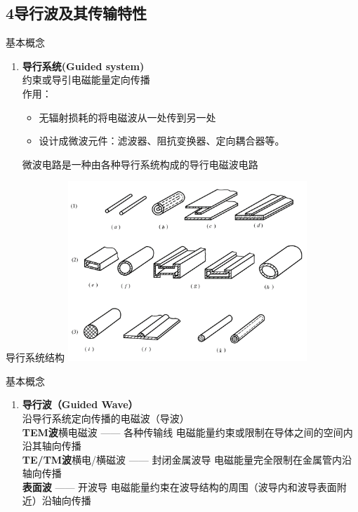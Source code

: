 \documentclass{ctexbeamer}
\newcounter{savedenum}
\newcommand*{\saveenum}{\setcounter{savedenum}{\theenumi}}
\newcommand*{\resume}{\setcounter{enumi}{\thesavedenum}}
\begin{document}
\subsection{4\quad 导行波及其传输特性}
\begin{frame}{基本概念}
  \begin{enumerate}
    \item \textbf{导行系统(Guided system)}
    \saveenum
    \\约束或导引电磁能量定向传播\\
    作用：\\
    \begin{itemize}
      \item 无辐射损耗的将电磁波从一处传到另一处
      \item 设计成微波元件：滤波器、阻抗变换器、定向耦合器等。
    \end{itemize}
    微波电路是一种由各种导行系统构成的导行电磁波电路
  \end{enumerate}

\end{frame}

\begin{frame}{导行系统结构}
    \centering
    \includegraphics[width=9cm]{guidesystem.png}
\end{frame}

\begin{frame}{基本概念}
  \begin{enumerate}
    \resume
    \item \textbf{导行波（Guided Wave）}
    \\沿导行系统定向传播的电磁波（导波）
    \\\textbf{TEM波}\quad 横电磁波 —— 各种传输线 电磁能量约束或限制在导体之间的空间内沿其轴向传播
    \\\textbf{TE/TM波}\quad 横电/横磁波 —— 封闭金属波导 电磁能量完全限制在金属管内沿轴向传播
    \\\textbf{表面波} —— 开波导 电磁能量约束在波导结构的周围（波导内和波导表面附近）沿轴向传播
    \saveenum
  \end{enumerate}
\end{frame}
\end{document}
